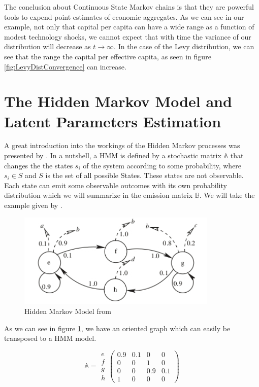 \documentclass[a4paper,12pt]{article}
\theoremstyle{definition}
\begin{document}
The conclusion about Continuous State Markov chains is that they are powerful tools to expend point estimates of economic aggregates. As we can see in our example, not only that capital per capita can have a wide range as a function of modest technology shocks, we cannot expect that with time the variance of our distribution will decrease as $t \to \infty$. In the case of the Levy distribution, we can see that the range the capital per effective capita, as seen in figure \ref{fig:LevyDistConvergence} can increase. 



\newpage
\section{The Hidden Markov Model and Latent Parameters Estimation}\label{HMM}
A great introduction into the workings of the Hidden Markov processes was presented by \cite{Rabiner89}. In a nutshell, a HMM is defined by a stochastic matrix $\mathbb{A}$ that changes the the states $s_i$ of the system according to some probability, where $s_i \in S$ and $S$ is the set of all possible States. These states are not observable. Each state can emit some observable outcomes with its own probability distribution which we will summarize in the emission matrix $\mathbb{B}$. We will take the example given by \cite[pp.9]{fraser08}.

\begin{figure}[h]
\caption{Hidden Markov Model from \cite[pp.9]{fraser08}}
\label{fig:HMM}
\includegraphics[width=0.85\textwidth]{HMM} 
\centering
\end{figure}

As we can see in figure \ref{fig:HMM}, we have an oriented graph which can easily be transposed to a HMM model. 

\[ \mathbb{A} = \begin{array}{c} e \\ f \\ g \\ h \end{array} \left( \begin{array}{cccc}
0.9 & 0.1& 0  & 0 \\
0   & 0  & 1  & 0 \\
0   & 0  & 0.9& 0.1 \\
1   & 0  & 0  & 0 \end{array} \right)\]
\end{document}
